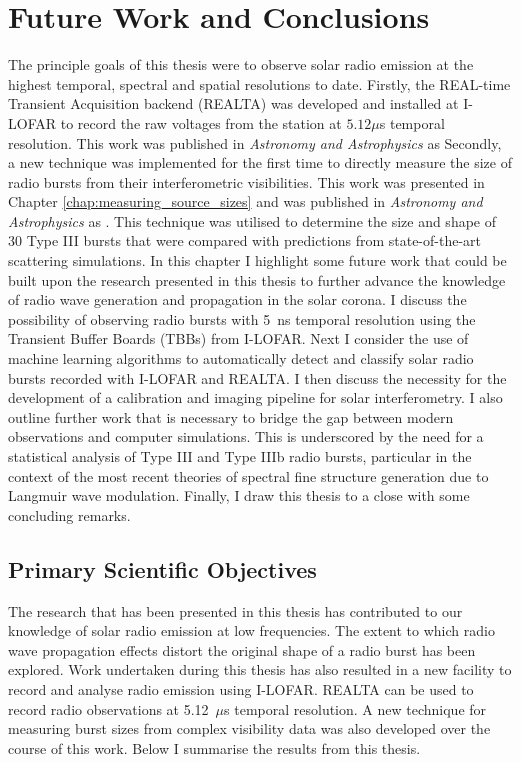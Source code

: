 \doublespacing
\chapter{Future Work and Conclusions}
\label{chap:future}
The principle goals of this thesis were to observe solar radio emission at the highest temporal, spectral and spatial resolutions to date. Firstly, the REAL-time Transient Acquisition backend (REALTA) was developed and installed at I-LOFAR to record the raw voltages from the station at $5.12 \mu$s temporal resolution. This work was published in \textit{Astronomy and Astrophysics} as \cite{Murphy2021b}
Secondly, a new technique was implemented for the first time to directly measure the size of radio bursts from their interferometric visibilities. This work was presented in Chapter \ref{chap:measuring_source_sizes} and was published in \textit{Astronomy and Astrophysics} as \cite{Murphy2021}. This technique was utilised to determine the size and shape of 30 Type III bursts that were compared with predictions from state-of-the-art scattering simulations.
In this chapter I highlight some future work that could be built upon the research presented in this thesis to further advance the knowledge of radio wave generation and propagation in the solar corona. I discuss the possibility of observing radio bursts with 5~ns temporal resolution using the Transient Buffer Boards (TBBs) from I-LOFAR. Next I consider the use of machine learning algorithms to automatically detect and classify solar radio bursts recorded with I-LOFAR and REALTA. I then discuss the necessity for the development of a calibration and imaging pipeline for solar interferometry. I also outline further work that is necessary to bridge the gap between modern observations and computer simulations. This is underscored by the need for a statistical analysis of Type III and Type IIIb radio bursts, particular in the context of the most recent theories of spectral fine structure generation due to Langmuir wave modulation. Finally, I draw this thesis to a close with some concluding remarks.

\section{Primary Scientific Objectives}
The research that has been presented in this thesis has contributed to our knowledge of solar radio emission at low frequencies. The extent to which radio wave propagation effects distort the original shape of a radio burst has been explored. Work undertaken during this thesis has also resulted in a new facility to record and analyse radio emission using I-LOFAR. REALTA can be used to record radio observations at 5.12~$\mu$s temporal resolution. A new technique for measuring burst sizes from complex visibility data was also developed over the course of this work. Below I summarise the results from this thesis. 

